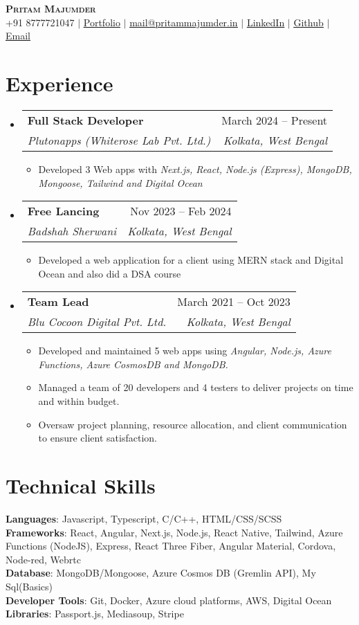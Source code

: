 \documentclass[letterpaper,10.5pt]{article}
\makeatletter
\newcommand{\resumeItem}[1]{
  \item\small{
    {#1 \vspace{-2pt}}
  }
}
\newcommand{\resumeSubheading}[4]{
  \vspace{-2pt}\item
    \begin{tabular*}{0.97\textwidth}[t]{l@{\extracolsep{\fill}}r}
      \textbf{#1} & #2 \\
      \textit{\small#3} & \textit{\small #4} \\
    \end{tabular*}\vspace{-7pt}
}
\newcommand{\resumeSubHeadingListStart}{\begin{itemize}[leftmargin=0.15in, label={}]}
\newcommand{\resumeSubHeadingListEnd}{\end{itemize}}
\newcommand{\resumeItemListStart}{\begin{itemize}}
\newcommand{\resumeItemListEnd}{\end{itemize}\vspace{-5pt}}
\makeatother
\begin{document}

\begin{center}
    \textbf{\Huge \scshape Pritam Majumder} \\ \vspace{1pt}
    \small +91 8777721047 $|$ \href{https://pritammajumder.in}{\underline{Portfolio}} $|$ 
    \href{mailto:mail@pritammajumder.in}{\underline{mail@pritammajumder.in}} $|$ 
    \href{https://www.linkedin.com/in/pritammajumder16}{\underline{LinkedIn}} $|$
    \href{https://github.com/pritammajumder16}{\underline{Github}}   $|$  \href{mailto:mail@pritammajumder.in}{\underline{Email}}
\end{center}


\section{Experience}
  \resumeSubHeadingListStart
\resumeSubheading
      {Full Stack Developer}{March 2024 -- Present}
      {Plutonapps (Whiterose Lab Pvt. Ltd.)}{Kolkata, West Bengal}
      \resumeItemListStart
        \resumeItem{Developed 3 Web apps with \emph{ Next.js, React, Node.js (Express), MongoDB, Mongoose, Tailwind  and Digital Ocean}}
      \resumeItemListEnd
    \resumeSubheading
      {Free Lancing}{Nov 2023 -- Feb 2024}
      {Badshah Sherwani}{Kolkata, West Bengal}
      \resumeItemListStart
        \resumeItem{Developed a web application for a client using MERN stack and Digital Ocean and also did a DSA course}
      \resumeItemListEnd
    \resumeSubheading
      {Team Lead}{March 2021 -- Oct 2023}
      {Blu Cocoon Digital Pvt. Ltd.}{Kolkata, West Bengal}
      \resumeItemListStart
        \resumeItem{Developed and maintained 5 web apps using \emph{ Angular, Node.js, Azure Functions, Azure CosmosDB and MongoDB.}}
        \resumeItem{Managed a team of 20 developers and 4 testers to deliver projects on time and within budget.} \resumeItem{Oversaw project planning, resource allocation, and client communication to ensure client satisfaction.}
      \resumeItemListEnd
  \resumeSubHeadingListEnd
\section{Technical Skills}
 \begin{itemize}[leftmargin=0.15in, label={}]
    \small{\item{
     \textbf{Languages}{: Javascript, Typescript, C/C++,  HTML/CSS/SCSS} \\
     \textbf{Frameworks}{: React, Angular, Next.js, Node.js, React Native, Tailwind, Azure Functions (NodeJS),  Express, React Three Fiber, Angular Material, Cordova, Node-red, Webrtc} \\\textbf{Database}{: MongoDB/Mongoose, Azure Cosmos DB (Gremlin API), My Sql(Basics)} \\
     \textbf{Developer Tools}{: Git, Docker, Azure cloud platforms, AWS, Digital Ocean} \\
     \textbf{Libraries}{: Passport.js, Mediasoup, Stripe}
    }}
 \end{itemize}
\end{document}

